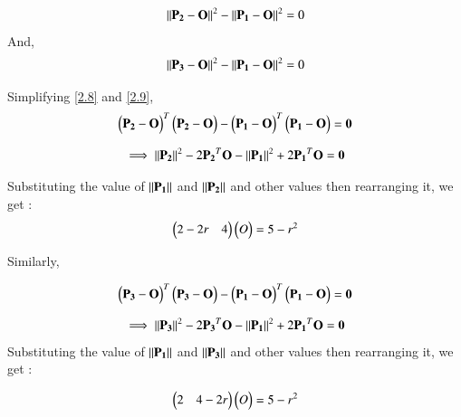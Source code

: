 \documentclass[journal,12pt,twocolumn]{IEEEtran}
\begin{document}
\begin{align}
\left\lVert  \mathbf{ P_2} - \mathbf{O}\right\rVert^{2}  - \left\lVert \mathbf{P_1}  - \mathbf{O}\right\rVert^{2}   = 0 \label{2.8}
\end{align}
And,
\begin{align}
\left\lVert \mathbf{ P_3} - \mathbf{O}\right\rVert^{2}   - \left\lVert\mathbf{ P_1} - \mathbf{O}\right\rVert^{2}  = 0 \label{2.9}
\end{align}

 Simplifying   \ref{2.8} and \ref{2.9},
\begin{align}
\begin{pmatrix}\mathbf{P_2} - \mathbf{O}\end{pmatrix}^T \begin{pmatrix}\mathbf{P_2} - \mathbf{ O}\end{pmatrix} - \begin{pmatrix}\mathbf{P_1} - \mathbf{O}\end{pmatrix}^T\begin{pmatrix}\mathbf{P_1} - \mathbf{O}\end{pmatrix} = \mathbf{0} \label{2.10}
\end{align}



\begin{align}
\implies \left\lVert\mathbf{P_2}\right\rVert^2 - 2 \mathbf{P_2}^T\mathbf{O} - \left\lVert\mathbf{P_1}\right\rVert^2 +2\mathbf{P_1}^T \mathbf{O}  = \mathbf{0} \label{2.11}
\end{align}

 Substituting the value of $\left\lVert\mathbf{P_1}\right\rVert$ and $\left\lVert\mathbf{P_2}\right\rVert$ and other values then rearranging it, we get :
\begin{align}
\begin{pmatrix}2 -2r & 4 \\\end{pmatrix}\begin{pmatrix}O\end{pmatrix} = 5-r^2 \label{2.12}
\end{align}





Similarly,

\begin{align}
\begin{pmatrix}\mathbf{P_3} - \mathbf{O}\end{pmatrix}^T \begin{pmatrix}\mathbf{P_3} - \mathbf{ O}\end{pmatrix} - \begin{pmatrix}\mathbf{P_1} - \mathbf{O}\end{pmatrix}^T\begin{pmatrix}\mathbf{P_1} - \mathbf{O}\end{pmatrix} = \mathbf{0} \label{2.13}
\end{align}



\begin{align}
\implies \left\lVert\mathbf{P_3}\right\rVert^2 - 2 \mathbf{P_3}^T\mathbf{O} - \left\lVert\mathbf{P_1}\right\rVert^2 +2\mathbf{P_1}^T \mathbf{O}  = \mathbf{0} \label{2.14}
\end{align}
Substituting the value of $\left\lVert\mathbf{P_1}\right\rVert$ and $\left\lVert\mathbf{P_3}\right\rVert$ and other values then  rearranging it, we get :

\begin{align}
\begin{pmatrix}2  & 4 -2r \\\end{pmatrix}\begin{pmatrix}O\end{pmatrix} = 5-r^2 \label{2.15}
\end{align}
\end{document}
